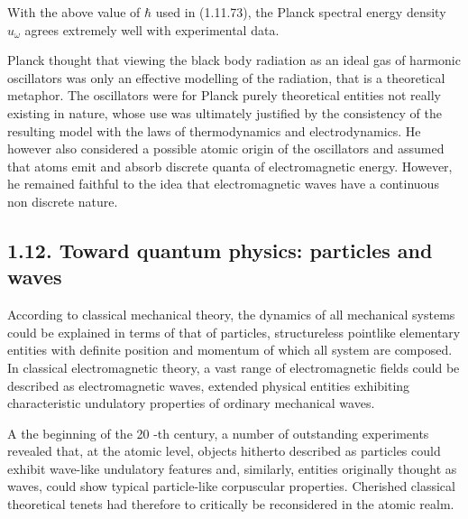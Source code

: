 \documentclass{article}
\begin{document}
With the above value of $\hbar$ used in (1.11.73), the Planck spectral energy density $u_{\omega}$ agrees extremely well with experimental data.

Planck thought that viewing the black body radiation as an ideal gas of harmonic oscillators was only an effective modelling of the radiation, that is a theoretical metaphor. The oscillators were for Planck purely theoretical entities not really existing in nature, whose use was ultimately justified by the consistency of the resulting model with the laws of thermodynamics and electrodynamics. He however also considered a possible atomic origin of the oscillators and assumed that atoms emit and absorb discrete quanta of electromagnetic energy. However, he remained faithful to the idea that electromagnetic waves have a continuous non discrete nature.

\subsection*{1.12. Toward quantum physics: particles and waves}

According to classical mechanical theory, the dynamics of all mechanical systems could be explained in terms of that of particles, structureless pointlike elementary entities with definite position and momentum of which all system are composed. In classical electromagnetic theory, a vast range of electromagnetic fields could be described as electromagnetic waves, extended physical entities exhibiting characteristic undulatory properties of ordinary mechanical waves.

A the beginning of the 20 -th century, a number of outstanding experiments revealed that, at the atomic level, objects hitherto described as particles could exhibit wave-like undulatory features and, similarly, entities originally thought as waves, could show typical particle-like corpuscular properties. Cherished classical theoretical tenets had therefore to critically be reconsidered in the atomic realm.
\end{document}
